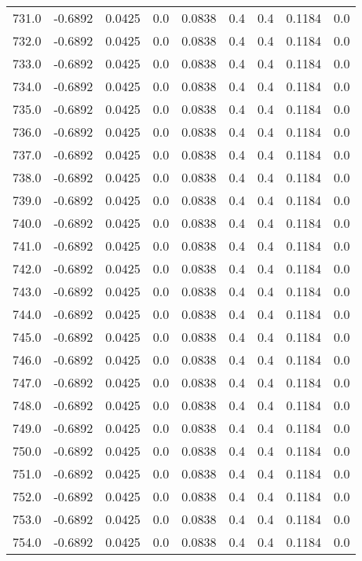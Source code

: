 \begin{longtable}{lrrrrrrrr}
731.0 & -0.6892 & 0.0425 & 0.0 & 0.0838 & 0.4 & 0.4 & 0.1184 & 0.0 \\
732.0 & -0.6892 & 0.0425 & 0.0 & 0.0838 & 0.4 & 0.4 & 0.1184 & 0.0 \\
733.0 & -0.6892 & 0.0425 & 0.0 & 0.0838 & 0.4 & 0.4 & 0.1184 & 0.0 \\
734.0 & -0.6892 & 0.0425 & 0.0 & 0.0838 & 0.4 & 0.4 & 0.1184 & 0.0 \\
735.0 & -0.6892 & 0.0425 & 0.0 & 0.0838 & 0.4 & 0.4 & 0.1184 & 0.0 \\
736.0 & -0.6892 & 0.0425 & 0.0 & 0.0838 & 0.4 & 0.4 & 0.1184 & 0.0 \\
737.0 & -0.6892 & 0.0425 & 0.0 & 0.0838 & 0.4 & 0.4 & 0.1184 & 0.0 \\
738.0 & -0.6892 & 0.0425 & 0.0 & 0.0838 & 0.4 & 0.4 & 0.1184 & 0.0 \\
739.0 & -0.6892 & 0.0425 & 0.0 & 0.0838 & 0.4 & 0.4 & 0.1184 & 0.0 \\
740.0 & -0.6892 & 0.0425 & 0.0 & 0.0838 & 0.4 & 0.4 & 0.1184 & 0.0 \\
741.0 & -0.6892 & 0.0425 & 0.0 & 0.0838 & 0.4 & 0.4 & 0.1184 & 0.0 \\
742.0 & -0.6892 & 0.0425 & 0.0 & 0.0838 & 0.4 & 0.4 & 0.1184 & 0.0 \\
743.0 & -0.6892 & 0.0425 & 0.0 & 0.0838 & 0.4 & 0.4 & 0.1184 & 0.0 \\
744.0 & -0.6892 & 0.0425 & 0.0 & 0.0838 & 0.4 & 0.4 & 0.1184 & 0.0 \\
745.0 & -0.6892 & 0.0425 & 0.0 & 0.0838 & 0.4 & 0.4 & 0.1184 & 0.0 \\
746.0 & -0.6892 & 0.0425 & 0.0 & 0.0838 & 0.4 & 0.4 & 0.1184 & 0.0 \\
747.0 & -0.6892 & 0.0425 & 0.0 & 0.0838 & 0.4 & 0.4 & 0.1184 & 0.0 \\
748.0 & -0.6892 & 0.0425 & 0.0 & 0.0838 & 0.4 & 0.4 & 0.1184 & 0.0 \\
749.0 & -0.6892 & 0.0425 & 0.0 & 0.0838 & 0.4 & 0.4 & 0.1184 & 0.0 \\
750.0 & -0.6892 & 0.0425 & 0.0 & 0.0838 & 0.4 & 0.4 & 0.1184 & 0.0 \\
751.0 & -0.6892 & 0.0425 & 0.0 & 0.0838 & 0.4 & 0.4 & 0.1184 & 0.0 \\
752.0 & -0.6892 & 0.0425 & 0.0 & 0.0838 & 0.4 & 0.4 & 0.1184 & 0.0 \\
753.0 & -0.6892 & 0.0425 & 0.0 & 0.0838 & 0.4 & 0.4 & 0.1184 & 0.0 \\
754.0 & -0.6892 & 0.0425 & 0.0 & 0.0838 & 0.4 & 0.4 & 0.1184 & 0.0 \\

\end{longtable}

